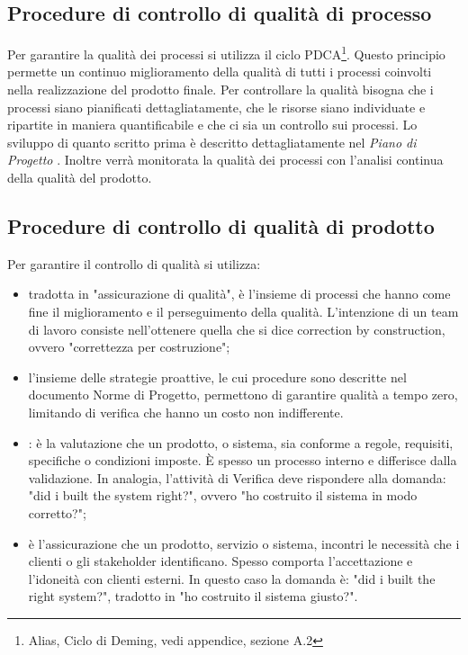 \subsection{Procedure di controllo di qualità di processo} %
\label{2.2}
Per garantire la qualità dei processi si utilizza il ciclo PDCA\footnote{Alias, Ciclo di Deming, vedi appendice, sezione A.2}.  Questo principio permette un continuo miglioramento della qualità di tutti i processi coinvolti nella realizzazione del prodotto finale.
Per controllare la qualità bisogna che i processi siano pianificati dettagliatamente, che le risorse siano individuate e ripartite in maniera quantificabile e che ci sia un controllo sui processi. Lo sviluppo di quanto scritto prima è descritto dettagliatamente nel \emph{Piano di Progetto \versionePianoDiProgetto{}}.
Inoltre verrà monitorata la qualità dei processi con l'analisi continua della qualità del prodotto.


\subsection{Procedure di controllo di qualità di prodotto} %
\label{2.3}
Per garantire il controllo di qualità si utilizza:
\begin{itemize}
\item {} tradotta in "assicurazione di qualità", è l'insieme di processi che hanno come fine il miglioramento e il perseguimento della qualità. L'intenzione di un team di lavoro consiste nell'ottenere quella che si dice correction by construction, ovvero "correttezza per costruzione";
\item {} l'insieme delle strategie proattive, le cui procedure sono descritte nel documento Norme di Progetto, permettono di garantire qualità a tempo zero, limitando  di verifica che hanno un costo non indifferente.
\item {}: è la valutazione che un prodotto,  o sistema, sia conforme a regole, requisiti, specifiche o condizioni imposte. È spesso un processo interno e differisce dalla validazione. In analogia, l'attività di Verifica deve rispondere alla domanda: "did i built the system right?", ovvero "ho costruito il sistema in modo corretto?";
\item {} è l'assicurazione che un prodotto, servizio o sistema, incontri le necessità che i clienti o gli stakeholder identificano. Spesso comporta l'accettazione e l'idoneità con clienti esterni. In questo caso la domanda è: "did i built the right system?", tradotto in "ho costruito il sistema giusto?".
\end{itemize}








